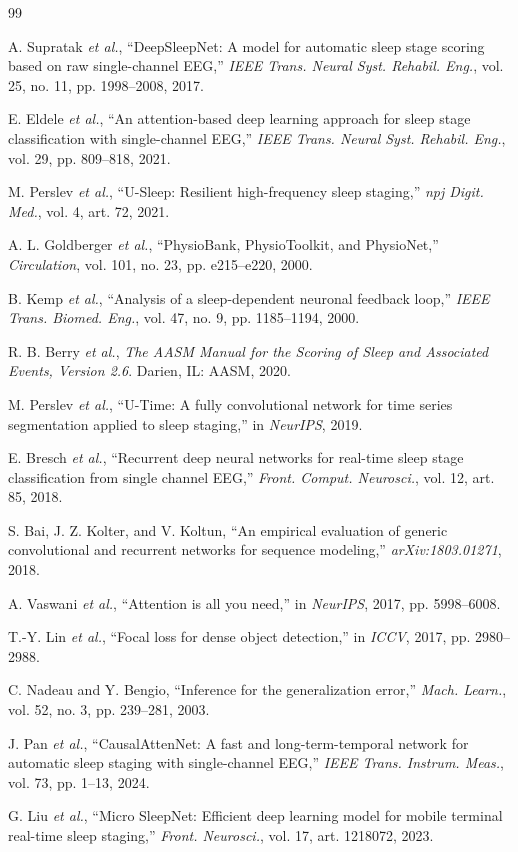 \documentclass[conference]{IEEEtran}
\begin{document}
\begin{thebibliography}{99}
\small

 A. Supratak \emph{et al.}, ``DeepSleepNet: A model for automatic sleep stage
scoring based on raw single-channel EEG,'' \emph{IEEE Trans. Neural Syst. Rehabil. Eng.}, vol. 25,
no. 11, pp. 1998--2008, 2017.

 E. Eldele \emph{et al.}, ``An attention-based deep learning approach for sleep
stage classification with single-channel EEG,'' \emph{IEEE Trans. Neural Syst. Rehabil. Eng.},
vol. 29, pp. 809--818, 2021.

 M. Perslev \emph{et al.}, ``U-Sleep: Resilient high-frequency sleep staging,''
\emph{npj Digit. Med.}, vol. 4, art. 72, 2021.

 A. L. Goldberger \emph{et al.}, ``PhysioBank, PhysioToolkit, and PhysioNet,''
\emph{Circulation}, vol. 101, no. 23, pp. e215--e220, 2000.

 B. Kemp \emph{et al.}, ``Analysis of a sleep-dependent neuronal feedback loop,''
\emph{IEEE Trans. Biomed. Eng.}, vol. 47, no. 9, pp. 1185--1194, 2000.

 R. B. Berry \emph{et al.}, \emph{The AASM Manual for the Scoring of Sleep and
Associated Events, Version 2.6}. Darien, IL: AASM, 2020.

 M. Perslev \emph{et al.}, ``U-Time: A fully convolutional network for time series
segmentation applied to sleep staging,'' in \emph{NeurIPS}, 2019.

 E. Bresch \emph{et al.}, ``Recurrent deep neural networks for real-time sleep
stage classification from single channel EEG,'' \emph{Front. Comput. Neurosci.}, vol. 12, art. 85,
2018.

 S. Bai, J. Z. Kolter, and V. Koltun, ``An empirical evaluation of generic convolutional
and recurrent networks for sequence modeling,'' \emph{arXiv:1803.01271}, 2018.

 A. Vaswani \emph{et al.}, ``Attention is all you need,'' in \emph{NeurIPS}, 2017,
pp. 5998--6008.

 T.-Y. Lin \emph{et al.}, ``Focal loss for dense object detection,'' in \emph{ICCV},
2017, pp. 2980--2988.

 C. Nadeau and Y. Bengio, ``Inference for the generalization error,'' \emph{Mach.
Learn.}, vol. 52, no. 3, pp. 239--281, 2003.

 J. Pan \emph{et al.}, ``CausalAttenNet: A fast and long-term-temporal network
for automatic sleep staging with single-channel EEG,'' \emph{IEEE Trans. Instrum. Meas.}, vol. 73,
pp. 1--13, 2024.

 G. Liu \emph{et al.}, ``Micro SleepNet: Efficient deep learning model for
mobile terminal real-time sleep staging,'' \emph{Front. Neurosci.}, vol. 17, art. 1218072, 2023.

\end{thebibliography}
\end{document}
